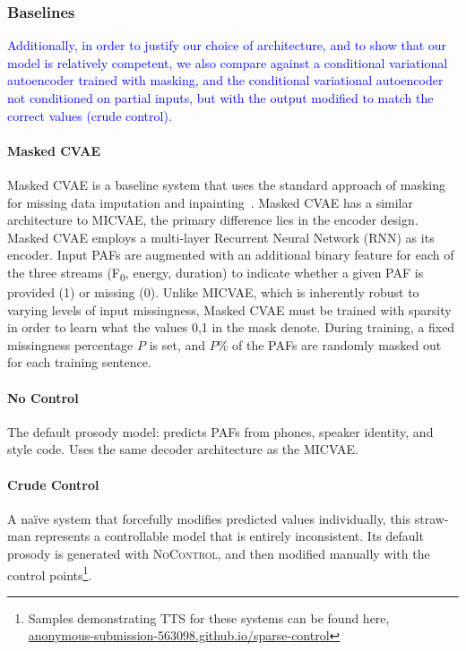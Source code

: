 \documentclass[a4paper,12pt,twoside,openright]{article}
\newcommand{\draft}[1]{\textcolor{blue}{#1}}
\newcommand{\fzero}{F\textsubscript{0}}
\begin{document}
\subsubsection{Baselines}

\draft{Additionally, in order to justify our choice of architecture, and to show that our model is relatively competent, we also compare against a conditional variational autoencoder trained with masking, and the conditional variational autoencoder not conditioned on partial inputs, but with the output modified to match the correct values (crude control).}

\paragraph{Masked CVAE} Masked CVAE is a baseline system that uses the standard approach of masking for missing data imputation and inpainting~\parencite{Elharrouss2019ImageIA}. Masked CVAE has a similar architecture to MICVAE, the primary difference lies in the encoder design. Masked CVAE employs a multi-layer Recurrent Neural Network (RNN) as its encoder. Input PAFs are augmented with an additional binary feature for each of the three streams (\fzero, energy, duration) to indicate whether a given PAF is provided (1) or missing (0). Unlike MICVAE, which is inherently robust to varying levels of input missingness, Masked CVAE must be trained with sparsity in order to learn what the values 0,1 in the mask denote. During training, a fixed missingness percentage \( P \) is set, and \( P \% \) of the PAFs are randomly masked out for each training sentence.


\paragraph{No Control} The default prosody model: predicts PAFs from phones, speaker identity, and style code. Uses the same decoder architecture as the MICVAE.

\paragraph{Crude Control} A na\"ive system that forcefully modifies predicted values individually, this straw-man represents a controllable model that is entirely inconsistent. Its default prosody is generated with \textsc{NoControl}, and then modified manually with the control points\footnote{Samples demonstrating TTS for these systems can be found here, \href{https://anonymous-submission-563098.github.io/sparse-control/}{anonymous-submission-563098.github.io/sparse-control}}.
\end{document}
